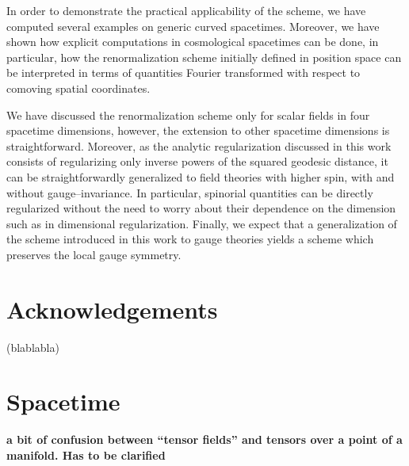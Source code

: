 \documentclass[11pt]{book}
\newcommand{\com}[1]{{\color{red}\bf #1}}
\theoremstyle{break}
\begin{document}
In order to demonstrate the practical applicability of the scheme, we have computed several examples on generic curved spacetimes. Moreover, we have shown how explicit computations in cosmological spacetimes can be done, in particular, how the renormalization scheme initially defined in position space can be interpreted in terms of quantities Fourier transformed with respect to comoving spatial coordinates.

We have discussed the renormalization scheme only for scalar fields in four spacetime dimensions, however, the extension to other spacetime dimensions is straightforward. Moreover, as the analytic regularization discussed in this work consists of regularizing only inverse powers of the squared geodesic distance, it can be straightforwardly generalized to field theories with higher spin, with and without gauge--invariance. In particular, spinorial quantities can be directly regularized without the need to worry about their dependence on the dimension such as in dimensional regularization. Finally, we expect that a generalization of the scheme introduced in this work to gauge theories yields a scheme which preserves the local gauge symmetry.


\newpage
\vspace*{100pt}
\thispagestyle{empty}
\chapter*{Acknowledgements}


(blablabla)



\setcounter{section}{0}
\appendix


\chapter{Spacetime}
\label{p:SPACETIME}


\com{a bit of confusion between ``tensor fields'' and tensors over a point of a manifold. Has to be clarified}
\end{document}
